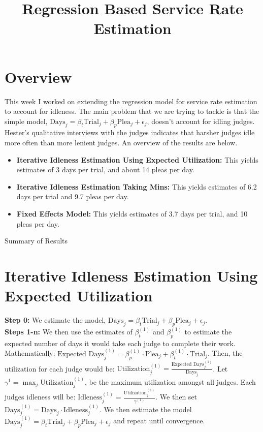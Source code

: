 \documentclass[11pt]{article}
\title{Regression Based Service Rate Estimation}
\begin{document}
\maketitle

\section{Overview}
  This week I worked on extending the regression model for service rate estimation to account for idleness.
  The main problem that we are trying to tackle is that the simple model, $\text{Days}_j = \beta_t \text{Trial}_j + \beta_p\text{Plea}_j +\epsilon_j$, doesn't account for idling judges. Hester's qualitative interviews with the judges indicates that harsher judges idle more often than more lenient judges.
  An overview of the results are below.

  \begin{itemize}
    \item \textbf{Iterative Idleness Estimation Using Expected Utilization:} This yields estimates of 3 days per trial, and about 14 pleas per day.

    \item \textbf{Iterative Idleness Estimation Taking Mins:} This yields estimates of 6.2 days per trial and 9.7 pleas per day.

    \item \textbf{Fixed Effects Model:} This yields estimates of 3.7 days per trial, and 10 pleas per day.
  \end{itemize}

  \begin{table}[H]
    \centering
    \caption{Summary of Results}
    
  \end{table}

\section{Iterative Idleness Estimation Using Expected Utilization}
  \textbf{Step 0:} We estimate the model, $\text{Days}_j = \beta_t\text{Trial}_j + \beta_p\text{Plea}_j +\epsilon_j$. \\

  \noindent \textbf{Steps 1-n:} We then use the estimates of $\beta^{(1)}_t$ and $\beta^{(1)}_p$ to estimate the expected number
  of days it would take each judge to complete their work. Mathematically: $\text{Expected Days}^{(1)}_j = \beta^{(1)}_p \cdot \text{Plea}_j + \beta^{(1)}_t \cdot \text{Trial}_j$. Then, the utilization for each judge would be: $\text{Utilization}^{(1)}_j = \frac{\text{Expected Days}^{(1)}_j}{\text{Days}_j}$. Let $\gamma^1 = \max_j \text{Utilization}^{(1)}_j$, be the maximum utilization amongst all judges. Each judges idleness will be: $\text{Idleness}^{(1)}_j = \frac{\text{Utilization}^{(1)}_j}{\gamma^{(1)}}$. We then set $\text{Days}^{(1)}_j = \text{Days}_j \cdot \text{Idleness}^{(1)}_j$. We then estimate the model $\text{Days}^{(1)}_j = \beta_t\text{Trial}_j + \beta_p\text{Plea}_j +\epsilon_j$ and repeat until convergence.
\end{document}
